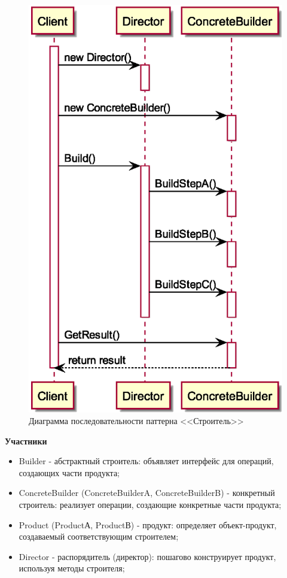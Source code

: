 \documentclass[PI,LAB]{HSEUniversity}
\begin{document}
\begin{figure}[p]
  \centering
  \includegraphics[scale=0.6]{Builder_SD.eps}
  \caption{Диаграмма последовательности паттерна <<Строитель>>}
\end{figure}
\clearpage

\textbf{Участники}
\begin{itemize}
  \item Builder - абстрактный строитель: объявляет интерфейс для операций, создающих части продукта;
  \item ConcreteBuilder (ConcreteBuilderA, ConcreteBuilderB) - конкретный строитель: реализует операции, создающие конкретные части продукта;
  \item Product (ProductА, ProductВ) - продукт: определяет объект-продукт, создаваемый соответствующим строителем;
  \item Director - распорядитель (директор): пошагово конструирует продукт, используя методы строителя;
\end{itemize}
\end{document}
